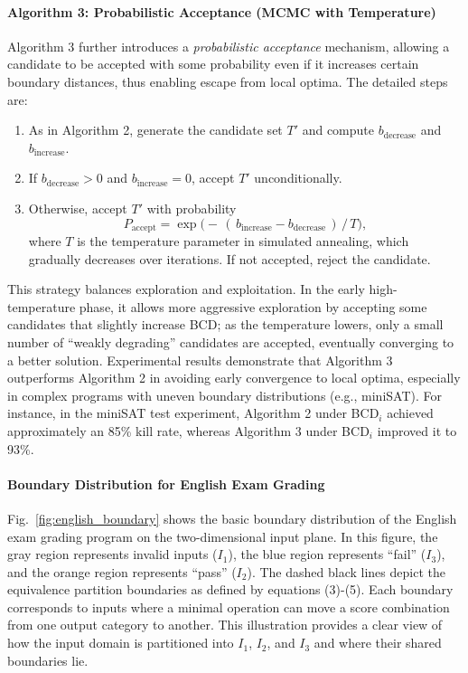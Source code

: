 \documentclass[manuscript,screen,review]{acmart}
\begin{document}
\paragraph{Algorithm 3: Probabilistic Acceptance (MCMC with Temperature)}  
Algorithm 3 further introduces a \emph{probabilistic acceptance} mechanism, allowing a candidate to be accepted with some probability even if it increases certain boundary distances, thus enabling escape from local optima. The detailed steps are:
\begin{enumerate}
  \item As in Algorithm 2, generate the candidate set $T'$ and compute $b_{\mathrm{decrease}}$ and $b_{\mathrm{increase}}$.
  \item If $b_{\mathrm{decrease}} > 0$ and $b_{\mathrm{increase}} = 0$, accept $T'$ unconditionally.
  \item Otherwise, accept $T'$ with probability
  \[
    P_{\mathrm{accept}} = \exp\bigl( -\, (\,b_{\mathrm{increase}} - b_{\mathrm{decrease}}\,)\,/\,T \bigr),
  \]
  where $T$ is the temperature parameter in simulated annealing, which gradually decreases over iterations. If not accepted, reject the candidate.
\end{enumerate}
This strategy balances exploration and exploitation. In the early high-temperature phase, it allows more aggressive exploration by accepting some candidates that slightly increase BCD; as the temperature lowers, only a small number of ``weakly degrading'' candidates are accepted, eventually converging to a better solution. Experimental results demonstrate that Algorithm 3 outperforms Algorithm 2 in avoiding early convergence to local optima, especially in complex programs with uneven boundary distributions (e.g., miniSAT). For instance, in the miniSAT test experiment, Algorithm 2 under BCD$_{i}$ achieved approximately an 85\% kill rate, whereas Algorithm 3 under BCD$_{i}$ improved it to 93\%.

\paragraph{Boundary Distribution for English Exam Grading}  
Fig.~\ref{fig:english_boundary} shows the basic boundary distribution of the English exam grading program on the two-dimensional input plane. In this figure, the gray region represents invalid inputs ($I_1$), the blue region represents ``fail'' ($I_3$), and the orange region represents ``pass'' ($I_2$). The dashed black lines depict the equivalence partition boundaries as defined by equations (3)-(5). Each boundary corresponds to inputs where a minimal operation can move a score combination from one output category to another. This illustration provides a clear view of how the input domain is partitioned into $I_1$, $I_2$, and $I_3$ and where their shared boundaries lie.
\end{document}
